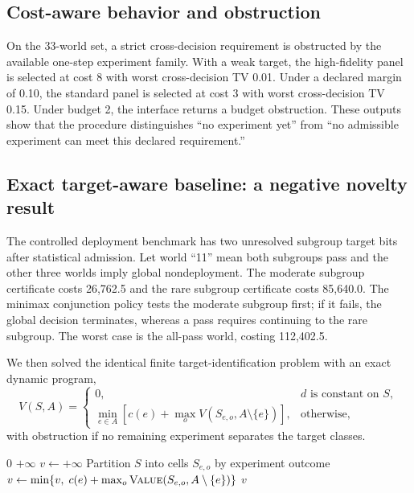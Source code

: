 \documentclass[11pt]{article}
\begin{document}
\subsection{Cost-aware behavior and obstruction}
On the 33-world set, a strict cross-decision requirement is obstructed by the available one-step experiment family. With a weak target, the high-fidelity panel is selected at cost 8 with worst cross-decision TV 0.01. Under a declared margin of 0.10, the standard panel is selected at cost 3 with worst cross-decision TV 0.15. Under budget 2, the interface returns a budget obstruction. These outputs show that the procedure distinguishes ``no experiment yet'' from ``no admissible experiment can meet this declared requirement.''

\subsection{Exact target-aware baseline: a negative novelty result}
The controlled deployment benchmark has two unresolved subgroup target bits after statistical admission. Let world ``11'' mean both subgroups pass and the other three worlds imply global nondeployment. The moderate subgroup certificate costs 26,762.5 and the rare subgroup certificate costs 85,640.0. The minimax conjunction policy tests the moderate subgroup first; if it fails, the global decision terminates, whereas a pass requires continuing to the rare subgroup. The worst case is the all-pass world, costing 112,402.5.

We then solved the identical finite target-identification problem with an exact dynamic program,
\begin{equation}
V(S,A)=
\begin{cases}
0, & d \text{ is constant on } S,\\
\min\limits_{e\in A}\left[c(e)+\max\limits_o V(S_{e,o},A\setminus\{e\})\right], & \text{otherwise},
\end{cases}
\label{eq:dp}
\end{equation}
with obstruction if no remaining experiment separates the target classes.

\begin{algorithm}[H]
\caption{Exact finite target-aware dynamic-programming baseline}
\label{alg:dp}
\begin{algorithmic}[1]
  \State \Return $0$
\EndIf
{}
  \State \Return $+\infty$
\EndIf
\State $v\gets+\infty$
  \State Partition $S$ into cells $S_{e,o}$ by experiment outcome
  \State $v\gets\min\{v,\;c(e)+\max_o \Call{Value}{S_{e,o},A\setminus\{e\}}\}$
\EndFor
\State \Return $v$
\EndFunction
\end{algorithmic}
\end{algorithm}
\end{document}
